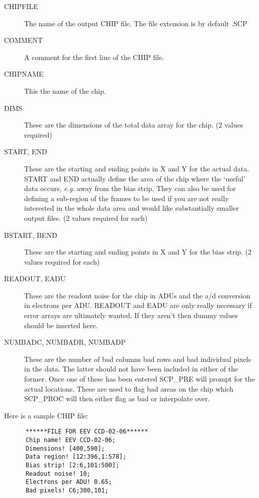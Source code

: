 \begin{description}

\item [CHIPFILE] The name of the output CHIP file. The file extension is
by default .SCP

\item [COMMENT] A comment for the first line of the CHIP file.

\item [CHIPNAME] This the name of the chip.

\item [DIMS] These are the dimensions of the total data array for the chip.
(2 values required)

\item [START, END] These are the starting and ending  points in X and Y for 
the actual data. START and END actually define the area of the chip
where the `useful' data occurs, {\it e.g.} away from the bias strip.  They
can also be used for defining a sub-region of the frames to be used if you 
are not really interested in the whole data area and would like substantially
smaller output files. (2 values required for each)

\item [BSTART, BEND]  These are the starting and ending points in X and Y  for
the bias strip.  (2 values required for each)

\item [READOUT, EADU] These are the readout noise for the chip in ADUs and the
a/d conversion in electrons per ADU.  READOUT and EADU are only really
necessary if error arrays are ultimately wanted.  If they aren't then dummy
values should be inserted here.

\item [NUMBADC, NUMBADR, NUMBADP] These are the number of bad columns bad rows
and bad individual pixels in the data.  The latter should not have been
included in either of the former.  Once one of these has been entered SCP\_PRE
will prompt for the actual locations. These are used to flag bad areas on the
chip which SCP\_PROC will then either flag as bad or interpolate over.

\end{description}

Here is a sample CHIP file:

\begin{verbatim}
      ******FILE FOR EEV CCD-02-06******  
      Chip name! EEV CCD-02-06;           
      Dimensions! [400,590];              
      Data region! [12:396,1:578];        
      Bias strip! [2:6,101:500];          
      Readout noise! 10;                  
      Electrons per ADU! 0.65;            
      Bad pixels! C6;300,101;             
\end{verbatim}

